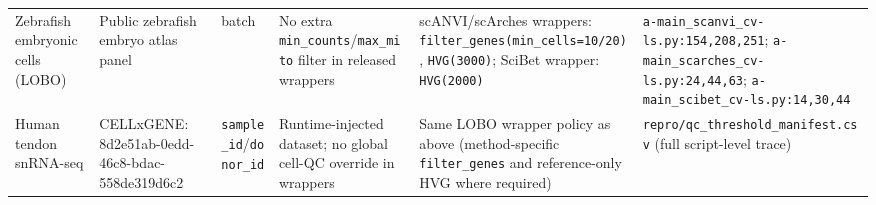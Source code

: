 \documentclass[11pt]{article}
\begin{document}
\begin{table}[htbp]
\begin{tabular}{p{} p{} p{} p{} p{} p{}}
Zebrafish embryonic cells (LOBO) & Public zebrafish embryo atlas panel & batch & No extra \texttt{min\_counts}/\texttt{max\_mito} filter in released wrappers & scANVI/scArches wrappers: \texttt{filter\_genes(min\_cells=10/20)}, \texttt{HVG(3000)}; SciBet wrapper: \texttt{HVG(2000)} & \texttt{a-main\_scanvi\_cv-ls.py:154,208,251}; \texttt{a-main\_scarches\_cv-ls.py:24,44,63}; \texttt{a-main\_scibet\_cv-ls.py:14,30,44} \\
Human tendon snRNA-seq & CELLxGENE: 8d2e51ab-0edd-46c8-bdac-558de319d6c2 & \texttt{sample\_id}/\texttt{donor\_id} & Runtime-injected dataset; no global cell-QC override in wrappers & Same LOBO wrapper policy as above (method-specific \texttt{filter\_genes} and reference-only HVG where required) & \texttt{repro/qc\_threshold\_manifest.csv} (full script-level trace) \\
\bottomrule
\end{tabular}
\normalsize
\end{table}
\end{document}
